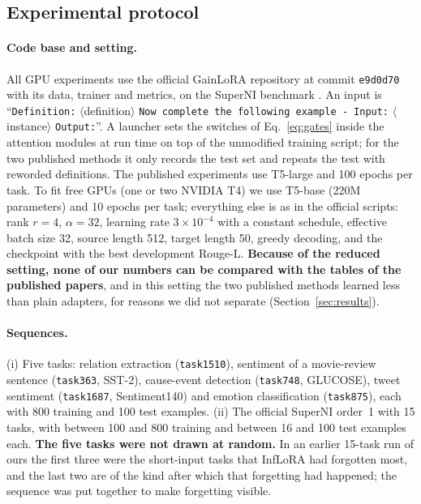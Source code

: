 \subsection{Experimental protocol}
\label{sec:protocol}

\paragraph{Code base and setting.} All GPU experiments use the official GainLoRA repository at
commit \texttt{e9d0d70} with its data, trainer and metrics, on the SuperNI benchmark
\citep{wang2022superni}. An input is ``\texttt{Definition:} $\langle$definition$\rangle$
\texttt{Now complete the following example - Input:} $\langle$instance$\rangle$ \texttt{Output:}''.
A launcher sets the switches of Eq.~\eqref{eq:gates} inside the attention modules at run time on top
of the unmodified training script; for the two published methods it only records the test set and
repeats the test with reworded definitions. The published experiments use T5-large and 100 epochs per
task. To fit free GPUs (one or two NVIDIA T4) we use T5-base \citep{raffel2020t5} (220M parameters) and
10 epochs per task; everything else is as in the official scripts: rank $r = 4$, $\alpha = 32$,
learning rate $3 \times 10^{-4}$ with a constant schedule, effective batch size 32, source length 512,
target length 50, greedy decoding, and the checkpoint with the best development Rouge-L.
\textbf{Because of the reduced setting, none of our numbers can be compared with the tables of the
published papers}, and in this setting the two published methods learned less than plain adapters, for
reasons we did not separate (Section~\ref{sec:results}).

\paragraph{Sequences.} (i) Five tasks: relation extraction (\texttt{task1510}), sentiment
of a movie-review sentence (\texttt{task363}, SST-2), cause-event detection (\texttt{task748},
GLUCOSE), tweet sentiment (\texttt{task1687}, Sentiment140) and emotion classification
(\texttt{task875}), each with 800 training and 100 test examples. (ii) The official SuperNI order~1
with 15 tasks, with between 100 and 800 training and between 16 and 100 test examples each.
\textbf{The five tasks were not drawn at random.} In an earlier 15-task run of ours the first three
were the short-input tasks that InfLoRA had forgotten most, and the last two are of the kind after
which that forgetting had happened; the sequence was put together to make forgetting visible.

